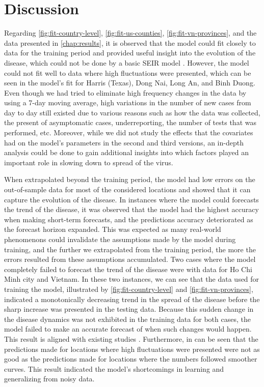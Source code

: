 \chapter{Discussion}
\label{chap:discussion}

Regarding \autoref{fig:fit-country-level}, \autoref{fig:fit-us-counties}, \autoref{fig:fit-vn-provinces}, and the data presented in \autoref{chap:results}, it is observed that the model could fit closely to data for the training period and provided useful insight into the evolution of the disease, which could not be done by a basic \gls{SEIR} model \cite{dandekarMachineLearningAidedGlobal2020a}.
However, the model could not fit well to data where high fluctuations were presented, which can be seen in the model's fit for Harris (Texas), Dong Nai, Long An, and Binh Duong.
Even though we had tried to eliminate high frequency changes in the data by using a 7-day moving average, high variations in the number of new cases from day to day still existed due to various reasons such as how the data was collected, the present of asymptomatic cases, underreporting, the number of tests that was performed, etc.
Moreover, while we did not study the effects that the covariates had on the model's parameters in the second and third versions, an in-depth analysis could be done to gain additional insights into which factors played an important role in slowing down to spread of the virus.

When extrapolated beyond the training period, the model had low errors on the out-of-sample data for most of the considered locations and showed that it can capture the evolution of the disease.
In instances where the model could forecasts the trend of the disease, it was observed that the model had the highest accuracy when making short-term forecasts, and the predictions accuracy deteriorated as the forecast horizon expanded.
This was expected as many real-world phenomenons could invalidate the assumptions made by the model during training, and the further we extrapolated from the training period, the more the errors resulted from these assumptions accumulated.
Two cases where the model completely failed to forecast the trend of the disease were with data for Ho Chi Minh city and Vietnam.
In these two instances, we can see that the data used for training the model, illustrated by \autoref{fig:fit-country-level} and \autoref{fig:fit-vn-provinces}, indicated a monotonically decreasing trend in the spread of the disease before the sharp increase was presented in the testing data.
Because this sudden change in the disease dynamics was not exhibited in the training data for both cases, the model failed to make an accurate forecast of when such changes would happen.
This result is aligned with existing studies \cite{arikInterpretableSequenceLearning}.
Furthermore, in can be seen that the predictions made for locations where high fluctuations were presented were not as good as the predictions made for locations where the numbers followed smoother curves.
This result indicated the model's shortcomings in learning and generalizing from noisy data.

